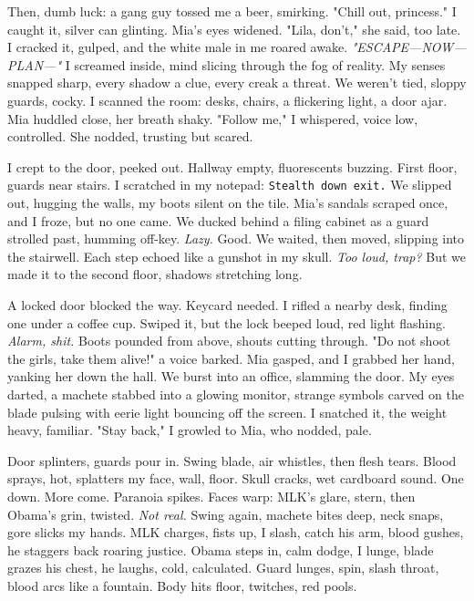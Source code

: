 \documentclass[12pt,oneside]{book} %
\newcommand{\note}[1]{\texttt{#1}}
\begin{document}
Then, dumb luck: a gang guy tossed me a beer, smirking. "Chill out, princess." I caught it, silver can glinting. Mia’s eyes widened. "\textnormal{Lila}, don’t," she said, too late. I cracked it, gulped, and the white male in me roared awake. \textit{"ESCAPE—NOW—PLAN—"} I screamed inside, mind slicing through the fog of reality. My senses snapped sharp, every shadow a clue, every creak a threat. We weren’t tied, sloppy guards, cocky. I scanned the room: desks, chairs, a flickering light, a door ajar. Mia huddled close, her breath shaky. "Follow me," I whispered, voice low, controlled. She nodded, trusting but scared.

I crept to the door, peeked out. Hallway empty, fluorescents buzzing. First floor, guards near stairs. I scratched in my notepad: \note{Stealth down exit.} We slipped out, hugging the walls, my boots silent on the tile. Mia’s sandals scraped once, and I froze, but no one came. We ducked behind a filing cabinet as a guard strolled past, humming off-key. \textit{Lazy.} Good. We waited, then moved, slipping into the stairwell. Each step echoed like a gunshot in my skull. \textit{Too loud, trap?} But we made it to the second floor, shadows stretching long.

A locked door blocked the way. Keycard needed. I rifled a nearby desk, finding one under a coffee cup. Swiped it, but the lock beeped loud, red light flashing. \textit{Alarm, shit.} Boots pounded from above, shouts cutting through. "Do not shoot the girls, take them alive!" a voice barked. Mia gasped, and I grabbed her hand, yanking her down the hall. We burst into an office, slamming the door. My eyes darted, a machete stabbed into a glowing monitor, strange symbols carved on the blade pulsing with eerie light bouncing off the screen. I snatched it, the weight heavy, familiar. "Stay back," I growled to Mia, who nodded, pale.

Door splinters, guards pour in. Swing blade, air whistles, then flesh tears. Blood sprays, hot, splatters my face, wall, floor. Skull cracks, wet cardboard sound. One down. More come. Paranoia spikes. Faces warp: \textnormal{MLK}’s glare, stern, then \textnormal{Obama}’s grin, twisted. \textit{Not real.} Swing again, machete bites deep, neck snaps, gore slicks my hands. \textnormal{MLK} charges, fists up, I slash, catch his arm, blood gushes, he staggers back roaring justice. \textnormal{Obama} steps in, calm dodge, I lunge, blade grazes his chest, he laughs, cold, calculated. Guard lunges, spin, slash throat, blood arcs like a fountain. Body hits floor, twitches, red pools.
\end{document}
